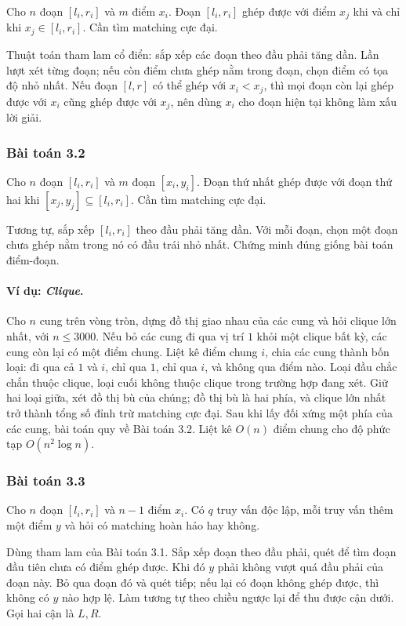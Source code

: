 \documentclass[11pt]{article}
\begin{document}
Cho \(n\) đoạn \([l_i,r_i]\) và \(m\) điểm \(x_i\). Đoạn \([l_i,r_i]\) ghép
được với điểm \(x_j\) khi và chỉ khi \(x_j\in [l_i,r_i]\). Cần tìm matching
cực đại.

Thuật toán tham lam cổ điển: sắp xếp các đoạn theo đầu phải tăng dần. Lần lượt
xét từng đoạn; nếu còn điểm chưa ghép nằm trong đoạn, chọn điểm có tọa độ nhỏ
nhất. Nếu đoạn \([l,r]\) có thể ghép với \(x_i<x_j\), thì mọi đoạn còn lại ghép
được với \(x_i\) cũng ghép được với \(x_j\), nên dùng \(x_i\) cho đoạn hiện tại
không làm xấu lời giải.

\subsubsection{Bài toán 3.2}

Cho \(n\) đoạn \([l_i,r_i]\) và \(m\) đoạn \([x_i,y_i]\). Đoạn thứ nhất ghép
được với đoạn thứ hai khi \([x_j,y_j]\subseteq [l_i,r_i]\). Cần tìm matching
cực đại.

Tương tự, sắp xếp \([l_i,r_i]\) theo đầu phải tăng dần. Với mỗi đoạn, chọn một
đoạn chưa ghép nằm trong nó có đầu trái nhỏ nhất. Chứng minh đúng giống bài
toán điểm-đoạn.

\paragraph{Ví dụ: \emph{Clique}.}
Cho \(n\) cung trên vòng tròn, dựng đồ thị giao nhau của các cung và hỏi clique
lớn nhất, với \(n\le 3000\). Nếu bỏ các cung đi qua vị trí \(1\) khỏi một
clique bất kỳ, các cung còn lại có một điểm chung. Liệt kê điểm chung \(i\),
chia các cung thành bốn loại: đi qua cả \(1\) và \(i\), chỉ qua \(1\), chỉ qua
\(i\), và không qua điểm nào. Loại đầu chắc chắn thuộc clique, loại cuối không
thuộc clique trong trường hợp đang xét. Giữ hai loại giữa, xét đồ thị bù của
chúng; đồ thị bù là hai phía, và clique lớn nhất trở thành tổng số đỉnh trừ
matching cực đại. Sau khi lấy đối xứng một phía của các cung, bài toán quy về
Bài toán 3.2. Liệt kê \(O(n)\) điểm chung cho độ phức tạp \(O(n^2\log n)\).

\subsubsection{Bài toán 3.3}

Cho \(n\) đoạn \([l_i,r_i]\) và \(n-1\) điểm \(x_i\). Có \(q\) truy vấn độc
lập, mỗi truy vấn thêm một điểm \(y\) và hỏi có matching hoàn hảo hay không.

Dùng tham lam của Bài toán 3.1. Sắp xếp đoạn theo đầu phải, quét để tìm đoạn
đầu tiên chưa có điểm ghép được. Khi đó \(y\) phải không vượt quá đầu phải của
đoạn này. Bỏ qua đoạn đó và quét tiếp; nếu lại có đoạn không ghép được, thì
không có \(y\) nào hợp lệ. Làm tương tự theo chiều ngược lại để thu được cận
dưới. Gọi hai cận là \(L,R\).
\end{document}
